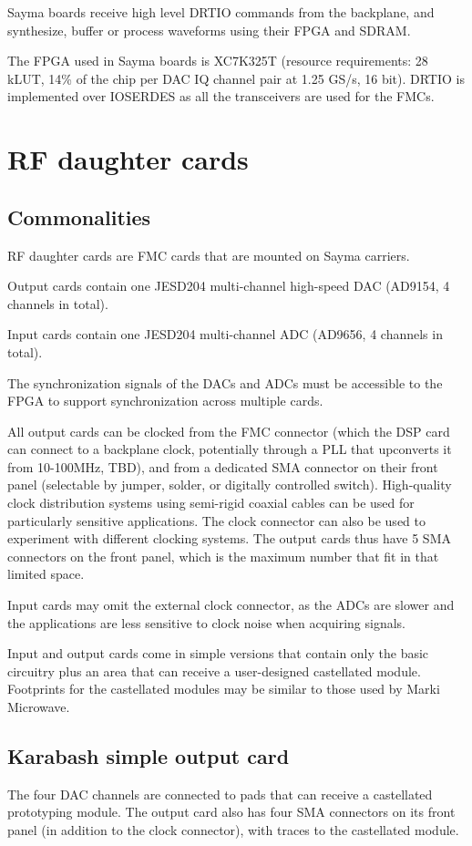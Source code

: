 \documentclass[11pt]{paper}
\begin{document}
Sayma boards receive high level DRTIO commands from the backplane, and synthesize, buffer or process waveforms using their FPGA and SDRAM.

The FPGA used in Sayma boards is XC7K325T (resource requirements: 28 kLUT, 14\% of the chip per DAC IQ channel pair at 1.25 GS/s, 16 bit). DRTIO is implemented over IOSERDES as all the transceivers are used for the FMCs.

\section{RF daughter cards}
\subsection{Commonalities}
RF daughter cards are FMC cards that are mounted on Sayma carriers.

Output cards contain one JESD204 multi-channel high-speed DAC (AD9154, 4 channels in total).

Input cards contain one JESD204 multi-channel ADC (AD9656, 4 channels in total).

The synchronization signals of the DACs and ADCs must be accessible to the FPGA to support synchronization across multiple cards.

All output cards can be clocked from the FMC connector (which the DSP card can connect to a backplane clock, potentially through a PLL that upconverts it from 10-100MHz, TBD), and from a dedicated SMA connector on their front panel (selectable by jumper, solder, or digitally controlled switch). High-quality clock distribution systems using semi-rigid coaxial cables can be used for particularly sensitive applications. The clock connector can also be used to experiment with different clocking systems. The output cards thus have 5 SMA connectors on the front panel, which is the maximum number that fit in that limited space.

Input cards may omit the external clock connector, as the ADCs are slower and the applications are less sensitive to clock noise when acquiring signals.

Input and output cards come in simple versions that contain only the basic circuitry plus an area that can receive a user-designed castellated module. Footprints for the castellated modules may be similar to those used by Marki Microwave.

\subsection{Karabash simple output card}
The four DAC channels are connected to pads that can receive a castellated prototyping module. The output card also has four SMA connectors on its front panel (in addition to the clock connector), with traces to the castellated module.
\end{document}

